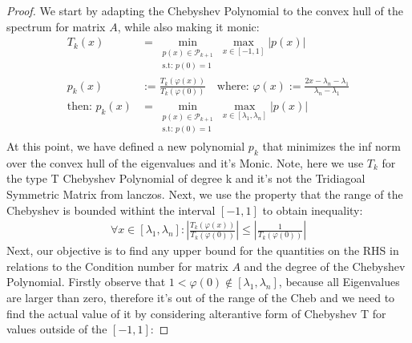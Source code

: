 \documentclass[]{article}
\theoremstyle{definition}
\begin{document}
            \begin{proof}
                We start by adapting the Chebyshev Polynomial to the convex hull of the spectrum for matrix $A$, while also making it monic: 
                \begin{align}
                    T_k(x) &= \min_{
                        \substack{
                            p(x)\in \mathcal{P}_{k + 1}
                            \\
                            \text{s.t: } p(0)  = 1
                            }
                        }\max_{x\in [-1, 1]}|p(x)|
                    \\
                    p_k(x) &:= \frac{T_k(\varphi(x))}{T_k(\varphi(0))}
                    \quad \text{where: } \varphi(x) := \frac{2x - \lambda_n - \lambda_1}{\lambda_n - \lambda_1}
                    \\
                    \text{then: } p_k(x) &= \min_{
                        \substack{
                            p(x)\in \mathcal{P}_{k + 1}
                            \\
                            \text{s.t: } p(0)  = 1
                        }
                    }\max_{x\in [\lambda_1, \lambda_n]}|p(x)|
                \end{align}
                At this point, we have defined a new polynomial $p_k$ that minimizes the inf norm over the convex hull of the eigenvalues and it's Monic. Note, here we use $T_k$ for the type T Chebyshev Polynomial of degree k and it's not the Tridiagoal Symmetric Matrix from lanczos. Next, we use the property that the range of the Chebyshev is bounded withint the interval $[-1, 1]$ to obtain inequality: 
                \begin{align}
                    \forall x \in [\lambda_1, \lambda_n]: \left|
                    \frac{T_k(\varphi(x))}{T_k(\varphi(0))}
                    \right|
                    \le 
                    \left|
                        \frac{1}{T_k(\varphi(0))}
                    \right|
                \end{align}
                Next, our objective is to find any upper bound for the quantities on the RHS in relations to the Condition number for matrix $A$ and the degree of the Chebyshev Polynomial. Firstly observe that $1 < \varphi(0) \not\in [\lambda_1, \lambda_n]$, because all Eigenvalues are larger than zero, therefore it's out of the range of the Cheb and we need to find the actual value of it by considering alterantive form of Chebyshev T for values outside of the $[-1,1]$: 

\end{proof}
\end{document}
